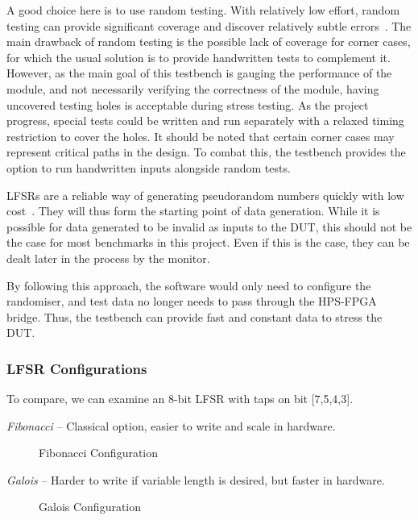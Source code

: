A good choice here is to use random testing.
With relatively low effort, random testing can provide significant coverage
and discover relatively subtle errors~\cite{Duran1}.
The main drawback of random testing is the possible lack of coverage for corner
cases, for which the usual solution is to provide handwritten tests to
complement it.
However, as the main goal of this testbench is gauging the performance of
the module, and not necessarily verifying the correctness of the module,
having uncovered testing holes is acceptable during stress testing.
As the project progress, special tests could be written and run separately
with a relaxed timing restriction to cover the holes.
It should be noted that certain corner cases may represent critical paths in
the design.
To combat this, the testbench provides the option to run handwritten inputs
alongside random tests.

LFSRs are a reliable way of generating pseudorandom numbers quickly with low
cost~\cite{Hazwani1}.
They will thus form the starting point of data generation.
While it is possible for data generated to be invalid as inputs to the DUT, this
should not be the case for most benchmarks in this project.
Even if this is the case, they can be dealt later in the process by the monitor.

By following this approach, the software would only need to configure the
randomiser, and test data no longer needs to pass through the HPS-FPGA bridge.
Thus, the testbench can provide fast and constant data to stress the DUT.

\subsubsection{LFSR Configurations}

To compare, we can examine an 8-bit LFSR with taps on bit [7,5,4,3].

\textit{Fibonacci} --
Classical option, easier to write and scale in hardware.

\begin{figure}[ht]
  \centering
  
  \caption{Fibonacci Configuration}
  \label{FibLFSR}
\end{figure}

\textit{Galois} --
Harder to write if variable length is desired, but faster in hardware.

\begin{figure}[ht]
  \centering
  
  \caption{Galois Configuration}
  \label{GalLFSR}
\end{figure}

